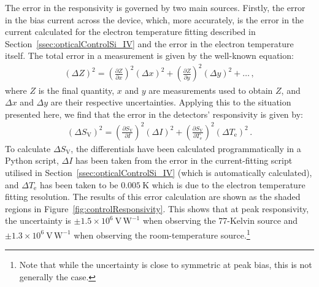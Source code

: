 \par 
The error in the responsivity is governed by two main sources. Firstly, the error in the bias current across the device, which, more accurately, is the error in the current calculated for the electron temperature fitting described in Section~\ref{ssec:opticalControlSi_IV} and the error in the electron temperature itself. The total error in a measurement is given by the well-known equation:
\begin{align}
\left(\Delta Z\right)^{2} = 
	\left(\frac{\partial Z}{\partial x}\right)^{2}\left(\Delta x\right)^{2} + 
	\left(\frac{\partial Z}{\partial y}\right)^{2}\left(\Delta y\right)^{2} +
	\dots \,, \label{eqn:Error}
\end{align}
where $Z$ is the final quantity, $x$ and $y$ are measurements used to obtain $Z$, and $\Delta x$ and $\Delta y$ are their respective uncertainties. Applying this to the situation presented here, we find that the error in the detectors' responsivity is given by:
\begin{align}
\left(\Delta S_{\mathrm{V}}\right)^{2} = 
	\left(\frac{\partial S_{\mathrm{V}}}{\partial I}\right)^{2}
		\left(\Delta I\right)^{2} +
	\left(\frac{\partial S_{\mathrm{V}}}{\partial T_{\mathrm{e}}}\right)^{2}
		\left(\Delta T_{\mathrm{e}}\right)^{2}\,. \label{eqn:errorSv}
\end{align}
To calculate $\Delta S_{\mathrm{V}}$, the differentials have been calculated programmatically in a Python script, $\Delta I$ has been taken from the error in the current-fitting script utilised in Section~\ref{ssec:opticalControlSi_IV} (which is automatically calculated), and $\Delta T_{\mathrm{e}}$ has been taken to be $0.005~\mathrm{K}$ which is due to the electron temperature fitting resolution. The results of this error calculation are shown as the shaded regions in Figure~\ref{fig:controlResponsivity}. This shows that at peak responsivity, the uncertainty is $\pm 1.5 \times 10^{6}~\mathrm{V\,W^{-1}}$ when observing the 77-Kelvin source and $\pm 1.3 \times 10^{6}~\mathrm{V\,W^{-1}}$ when observing the room-temperature source.\footnote{Note that while the uncertainty is close to symmetric at peak bias, this is not generally the case.}
%
